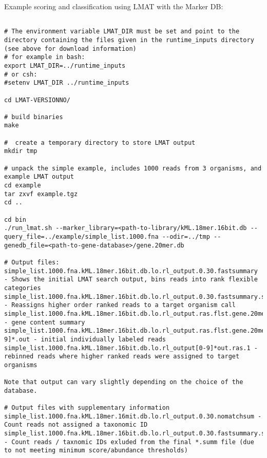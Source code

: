 \documentclass[11pt]{article}
\begin{document}
   
Example scoring and classification using LMAT with the Marker DB:

\begin{verbatim}

# The environment variable LMAT_DIR must be set and point to the directory containing the files given in the runtime_inputs directory (see above for download information)
# for example in bash:
export LMAT_DIR=../runtime_inputs
# or csh:
#setenv LMAT_DIR ../runtime_inputs

cd LMAT-VERSIONNO/

# build binaries
make

#  create a temporary directory to store LMAT output
mkdir tmp

# unpack the simple example, includes 1000 reads from 3 organisms, and example LMAT output
cd example
tar zxvf example.tgz
cd ..

cd bin
./run_lmat.sh --marker_library=<path-to-library/kML.18mer.16bit.db --query_file=../example/simple_list.1000.fna --odir=../tmp --genedb_file=<path-to-gene-database>/gene.20mer.db

# Output files:
simple_list.1000.fna.kML.18mer.16bit.db.lo.rl_output.0.30.fastsummary - Shows the initial LMAT search output, bins reads into rank flexible categories
simple_list.1000.fna.kML.18mer.16bit.db.lo.rl_output.0.30.fastsummary.summ - Reassigns higher order ranked reads to a target organism call
simple_list.1000.fna.kML.18mer.16bit.db.lo.rl_output.ras.flst.gene.20mer.db.rl_output.0.01.20.genesummary - gene content summary
simple_list.1000.fna.kML.18mer.16bit.db.lo.rl_output.ras.flst.gene.20mer.db.rl_output[0-9]*.out - initial individually labeled reads
simple_list.1000.fna.kML.18mer.16bit.db.lo.rl_output[0-9]*out.ras.1 - rebinned reads where higher ranked reads were assigned to target organisms

Note that output can vary slightly depending on the choice of the database.

# Output files with supplementary information
simple_list.1000.fna.kML.18mer.16mit.db.lo.rl_output.0.30.nomatchsum - Count reads not assigned a taxonomic ID
simple_list.1000.fna.kML.18mer.16bit.db.lo.rl_output.0.30.fastsummary.summ.leftover - Count reads / taxnomic IDs exluded from the final *.summ file (due to not meeting minimum score/abundance thresholds)


\end{verbatim}
\end{document}
